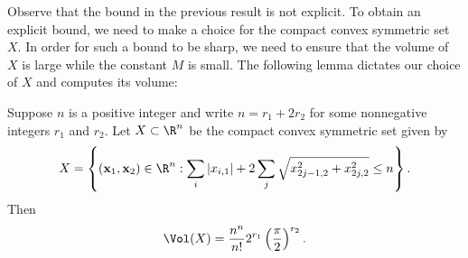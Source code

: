 \documentclass[12pt]{article}
\begin{document}
      Observe that the bound in the previous result is not explicit. To obtain an explicit bound, we need to make a choice for the compact convex symmetric set \(X\). In order for such a bound to be sharp, we need to ensure that the volume of \(X\) is large while the constant \(M\) is small. The following lemma dictates our choice of \(X\) and computes its volume:

      \begin{lemma}\label{lem:Minkowski_bound_lemma}
        Suppose \(n\) is a positive integer and write \(n = r_{1}+2r_{2}\) for some nonnegative integers \(r_{1}\) and \(r_{2}\). Let \(X \subset \R^{n}\) be the compact convex symmetric set given by
        \[
          X = \left\{(\mathbf{x}_{1},\mathbf{x}_{2}) \in \R^{n}:\sum_{i}|x_{i,1}|+2\sum_{j}\sqrt{x_{2j-1,2}^{2}+x_{2j,2}^{2}} \le n\right\}.
        \]
        Then
        \[
          \Vol(X) = \frac{n^{n}}{n!}2^{r_{1}}\left(\frac{\pi}{2}\right)^{r_{2}}.
        \]
      \end{lemma}
\end{document}
